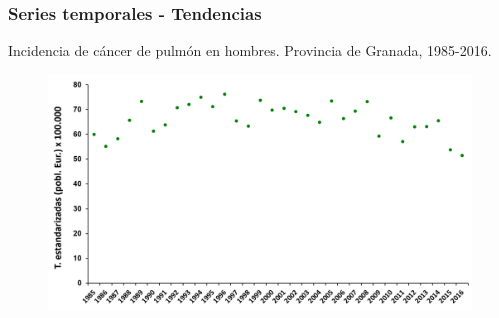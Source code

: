 \documentclass{beamer}
\begin{document}
\begin{frame}\frametitle{Series temporales - Tendencias}
	
	\centering
	Incidencia de cáncer de pulmón en hombres. Provincia de Granada, 1985-2016.
	\begin{figure}
		\centering
		\includegraphics[width=\textwidth]{images/tendencias_pulmon0.png}
	\end{figure}
	
\end{frame}
\end{document}
